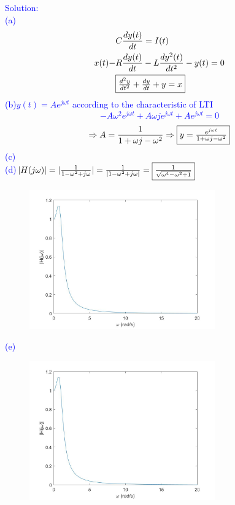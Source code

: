 \documentclass[12pt,a4paper]{article}
\begin{document}
\begin{tcolorbox}
\normalsize
\textcolor{blue}{Solution:\\
(a) $$\begin{aligned}
    &C\frac{dy(t)}{dt}=I(t)\\
    x(t)-&R\frac{dy(t)}{dt}-L\frac{dy^2(t)}{dt^2}-y(t)=0\\
    &\fbox{$\frac{d^2y}{dt^2}+\frac{dy}{dt}+y=x$}
\end{aligned}$$
(b)$y(t)=Ae^{j\omega t}$ according to the characteristic of LTI
$$-A\omega^2e^{j\omega t}+A\omega je^{j\omega t}+Ae^{j\omega t}=0$$
$$\Rightarrow A=\frac{1}{1+\omega j-\omega^2}\Rightarrow \fbox{$y=\frac{e^{j\omega t}}{1+\omega j-\omega^2}$}$$
(c)\\
(d)$|H(j\omega)|=|\frac{1}{1-\omega^2+j\omega}|=\frac{1}{|1-\omega^2+j\omega|}=\fbox{$\frac{1}{\sqrt{\omega^4-\omega^2+1}}$}$
\begin{figure}[H]
    \centering
    \includegraphics[width=8cm]{5e.jpg}
\end{figure}
(e) \begin{figure}[H]
    \centering
    \includegraphics[width=8cm]{5e.jpg}
\end{figure}
}
\end{tcolorbox}
\end{document}
